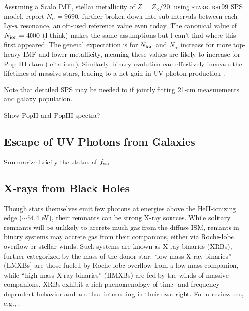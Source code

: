 Assuming a Scalo IMF, stellar metallicity of $Z=Z_{\odot}/20$, using \textsc{starburst99} SPS model, \cite{Barkana2005} report $N_{\alpha}=9690$, further broken down into sub-intervals between each Ly-$n$ resonance, an oft-used reference value even today. {\color{red} The canonical value of $N_{\text{ion}}=4000$ (I think) makes the same assumptions but I can't find where this first appeared.} The general expectation is for $N_{\text{ion}}$ and $N_{\alpha}$ increase for more top-heavy IMF and lower metallicity, meaning these values are likely to increase for Pop~III stars ({\color{red} citations}). Similarly, binary evolution can effectively increase the lifetimes of massive stars, leading to a net gain in UV photon production \cite{Stanway2016}.

{\color{red} Note that detailed SPS may be needed to if jointly fitting 21-cm measurements and galaxy population.}

{\color{red} Show PopII and PopIII spectra?}

\subsection{Escape of UV Photons from Galaxies}
{\color{red} Summarize briefly the status of $f_{\text{esc}}$.}



\subsection{X-rays from Black Holes}
Though stars themselves emit few photons at energies above the HeII-ionizing edge ($\sim 54.4$ eV), their remnants can be strong X-ray sources. While solitary remnants will be unlikely to accrete much gas from the diffuse ISM, remants in binary systems may accrete gas from their companions, either via Roche-lobe overflow or stellar winds. Such systems are known as X-ray binaries (XRBs), further categorized by the mass of the donor star: ``low-mass X-ray binaries'' (LMXBs) are those fueled by Roche-lobe overflow from a low-mass companion, while ``high-mass X-ray binaries'' (HMXBs) are fed by the winds of massive companions. XRBs exhibit a rich phenomenology of time- and frequency-dependent behavior and are thus interesting in their own right. For a review see, e.g., \cite{Remillard2006}.

